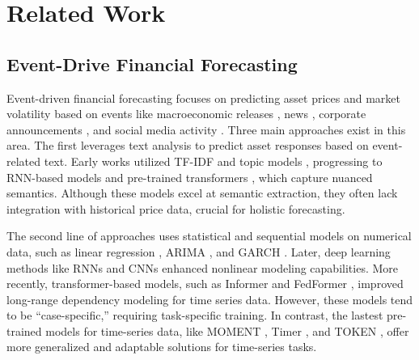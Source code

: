 \section{Related Work}
\subsection{Event-Drive Financial Forecasting} 
Event-driven financial forecasting \cite{BAO2025102616} focuses on predicting asset prices \cite{RePEc:snb:snbwpa:2013-11,Gilbert2010-dt} and market volatility \cite{https://doi.org/10.1111/jofi.12196,https://doi.org/10.1111/jofi.12818} based on events like macroeconomic releases \cite{Gilbert2010-dt}, news \cite{RePEc:arx:papers:1811.06173}, corporate announcements \cite{zhou-etal-2021-trade}, and social media activity \cite{xu-cohen-2018-stock}. Three main approaches exist in this area. The first leverages text analysis to predict asset responses based on event-related text. Early works utilized TF-IDF \cite{1196287,LI2014826} and topic models \cite{si-etal-2013-exploiting,NGUYEN20159603}, progressing to RNN-based models \cite{10.1145/3155133.3155202,liu2018leveragingfinancialnewsstock} and pre-trained transformers \cite{zhou-etal-2021-trade,shah-etal-2023-trillion}, which capture nuanced semantics. Although these models excel at semantic extraction, they often lack integration with historical price data, crucial for holistic forecasting.

The second line of approaches uses statistical and sequential models on numerical data, such as linear regression \cite{8212716}, ARIMA \cite{7046047}, and GARCH \cite{HYUPROH2007916}. Later, deep learning methods like RNNs \cite{liu2018leveragingfinancialnewsstock} and CNNs \cite{8126078,Durairaj2022} enhanced nonlinear modeling capabilities. More recently, transformer-based models, such as Informer \cite{Zhou_Zhang_Peng_Zhang_Li_Xiong_Zhang_2021} and FedFormer \cite{pmlr-v162-zhou22g}, improved long-range dependency modeling for time series data. However, these models tend to be ``case-specific,'' requiring task-specific training. In contrast, the lastest pre-trained models for time-series data, like MOMENT \cite{goswami2024moment}, Timer \cite{liu2024timer}, and TOKEN \cite{anonymous2024totem}, offer more generalized and adaptable solutions for time-series tasks.

